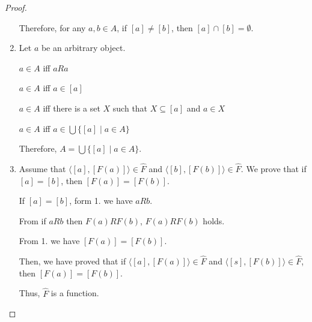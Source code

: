 \documentclass[12pt,a4paper,utf8]{article}
\theoremstyle{plain}
\begin{document}
\begin{proof}
\begin{enumerate}
        Therefore, for any $a , b \in A$, if $[a] \neq [b]$, then $[a] \cap [b] = \emptyset$. 
        
        \item
        Let $a$ be an arbitrary object.
        
        $a \in A$ iff $aRa$
        
        $a \in A$ iff $a \in [a]$
        
        $a \in A$ iff there is a set $X$ such that $X \subseteq[a]$ and $a \in X$
        
        $a \in A$ iff $a \in \bigcup \{[a] \mid a \in A \}$
        
        Therefore, $A=\bigcup \{[a] \mid a \in A \}$.
        
        \item
        Assume that $\langle [a],[F(a)]\rangle \in \widehat{F}$ and $\langle [b],[F(b)]\rangle\in \widehat{F}$. We prove that if $[a]=[b]$, then $[F(a)]=[F(b)]$.
        
        If $[a]=[b]$, form 1. we have $aRb$.
        
        From if $a R b$ then $F (a) R F (b)$, $F (a) R F (b)$
        holds.
        
        From 1. we have $[F(a)]=[F(b)]$.
        
        Then, we have proved that if $\langle [a],[F(a)]\rangle \in \widehat{F}$ and $\langle [s],[F(b)]\rangle\in \widehat{F}$, then $[F(a)]=[F(b)]$.
        
        Thus, $\widehat{F}$ is a function.
        
        
        
    \end{enumerate}
\end{proof}

\end{document}
